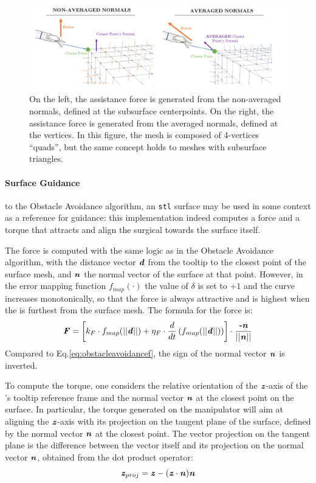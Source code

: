 \documentclass[../main.tex]{subfiles}
\begin{document}
\begin{figure}
    \centering
    \includegraphics[width=\textwidth]{images/normals_averaging.png}
    \caption{On the left, the assistance force is generated from the non-averaged normals, defined at the subsurface centerpoints. On the right, the assistance force is generated from the averaged normals, defined at the vertices. In this figure, the mesh is composed of 4-vertices ``quads'', but the same concept holds to meshes with subsurface triangles.}
    \label{fig:normalsaveraging}
\end{figure}

\paragraph{Surface Guidance}  to the Obstacle Avoidance algorithm, an \texttt{stl} surface may be used in some context as a reference for guidance: this implementation indeed computes a force and a torque that attracts and align the surgical \ee towards the surface itself. 

The force is computed with the same logic as in the Obstacle Avoidance algorithm, with the distance vector $\textbf{\textit{d}}$ from the \psm tooltip to the closest point of the surface mesh, and $\textbf{\textit{n}}$ the normal vector of the surface at that point. However, in the error mapping function $f_{map}(\cdot)$ the value of $\delta$ is set to $+1$ and the curve increases monotonically, so that the force is always attractive and is highest when the \psm is furthest from the surface mesh. The formula for the force is:
\begin{equation}
    \textbf{\textit{F}} = \left[k_F\cdot f_{map}(||\textbf{\textit{d}}||) + \eta_F\cdot \frac{d}{dt} \left( f_{map}(||\textbf{\textit{d}}||)\right)\right]\cdot \frac{\textbf{\textit{-n}}}{||\textbf{\textit{n}}||} 
\end{equation}
Compared to Eq.\ref{eq:obstacleavoidancef}, the sign of the normal vector $\textbf{\textit{n}}$ is inverted.

To compute the torque, one considers the relative orientation of the $\textbf{\textit{z}}$-axis of the \psm's tooltip reference frame and the normal vector $\textbf{\textit{n}}$ at the closest point on the surface. In particular, the torque generated on the manipulator will aim at aligning the $\textbf{\textit{z}}$-axis with its projection on the tangent plane of the surface, defined by the normal vector $\textbf{\textit{n}}$ at the closest point. The vector projection on the tangent plane is the difference between the vector itself and its projection on the normal vector $\textbf{\textit{n}}$, obtained from the dot product operator:
\begin{equation}
    \textbf{\textit{z}}_{proj} = \textbf{\textit{z}} - (\textbf{\textit{z}}\cdot\textbf{\textit{n}})\textbf{\textit{n}}
\end{equation} 
\end{document}
